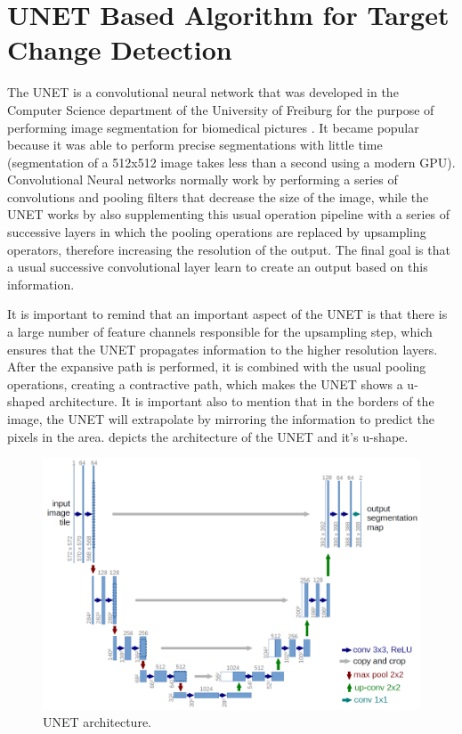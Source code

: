 \section{UNET Based Algorithm for Target Change Detection}
The UNET is a convolutional neural network that was developed in the Computer Science department of the University of Freiburg for the purpose of performing image segmentation for
biomedical pictures \cite{Unet}. It became popular because it was able to perform precise segmentations with little time (segmentation of a 512x512 image takes less than a second using a modern GPU).
Convolutional Neural networks normally work by performing a series of convolutions and pooling filters that decrease the size of the image, while the UNET works by also 
supplementing this usual operation pipeline with a series of successive layers in which the pooling operations are replaced by upsampling operators, therefore increasing the resolution of the output.
The final goal is that a usual successive convolutional layer learn to create an output based on this information. 

It is important to remind that an important aspect of the UNET is that there is a large number of feature channels responsible for the upsampling step, which ensures that the UNET propagates information
to the higher resolution layers. After the expansive path is performed, it is combined with the usual pooling operations, creating a contractive path, which makes the UNET shows a u-shaped architecture. 
It is important also to mention that in the borders of the image, the UNET will extrapolate by mirroring the information to predict the pixels in the area. 
 depicts the architecture of the UNET and it's u-shape.

\begin{figure}[ht]
    \centering
    \includegraphics[width=0.7\linewidth]{Chapter7/unet_architecture.png}
    \caption{UNET architecture.}
    \label{fig:unet_architecture}
\end{figure}


